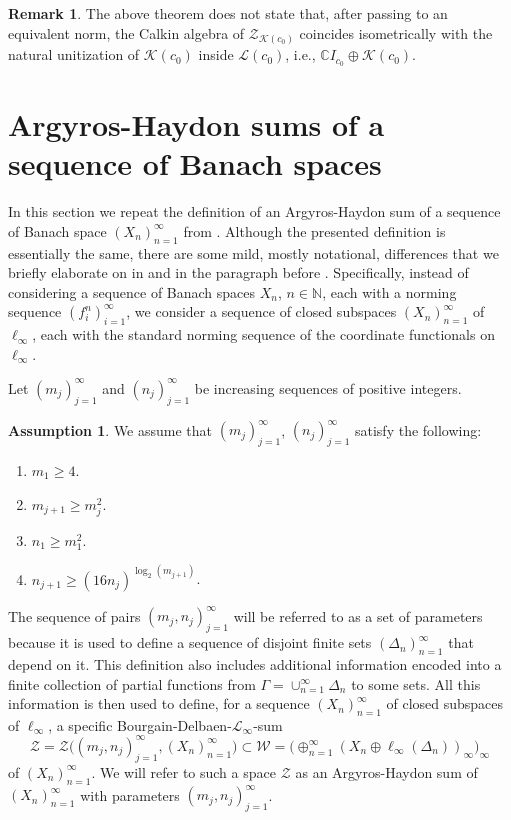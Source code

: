 \documentclass[11pt]{amsart}
\theoremstyle{definition}
\newtheorem{remark}[theorem]{Remark}
\newtheorem{assumption}[theorem]{Assumption}
\newcommand{\N}{\mathbb{N}}
\newcommand{\C}{\mathbb{C}}
\numberwithin{equation}{section}
\begin{document}
\begin{remark}
The above theorem does not state that, after passing to an equivalent norm, the Calkin algebra of $\mathcal{Z}_{\mathcal{K}(c_0)}$ coincides isometrically with the natural unitization of $\mathcal{K}(c_0)$ inside $\mathcal{L}(c_0)$, i.e.,  $\C I_{c_0}\oplus\mathcal{K}(c_0)$.
\end{remark}






\section{Argyros-Haydon sums of a sequence of Banach spaces}
\label{AH sums section}
In this section we repeat the definition of an Argyros-Haydon sum of a sequence of Banach space $(X_n)_{n=1}^\infty$ from \cite[Sections 4 and 5]{zisimopoulou:2014}. Although the presented definition is essentially the same, there are some mild, mostly notational, differences that we briefly elaborate on in  and in the paragraph before . Specifically, instead of considering a sequence of Banach spaces $X_n$, $n\in\N$, each with a norming sequence $(f_i^n)_{i=1}^\infty$, we consider a sequence of closed subspaces $(X_n)_{n=1}^\infty$ of $\ell_\infty$, each with the standard norming sequence of the coordinate functionals on $\ell_\infty$.


Let $(m_j)_{j=1}^\infty$ and $(n_j)_{j=1}^\infty$ be increasing sequences of positive integers.
\begin{assumption}
\label{lacunary assumption}
We assume that $(m_j)_{j=1}^\infty$, $(n_j)_{j=1}^\infty$ satisfy the following:
\begin{enumerate}[label=(\greek*)]
    
    \item $m_1\geq 4$.

    \item $m_{j+1}\geq m_j^2$.

    \item $n_1\geq m_1^2$.

    \item $n_{j+1}\geq (16n_j)^{\log_2(m_{j+1})}$.

\end{enumerate}
\end{assumption}
The sequence of pairs $(m_j,n_j)_{j=1}^\infty$ will be referred to as a set of parameters because it is used to define a sequence of disjoint finite sets $(\Delta_n)_{n=1}^\infty$ that depend on it. This definition also includes additional information encoded into a finite collection of partial functions from $\Gamma = \cup_{n=1}^\infty\Delta_n$ to some sets. All this information is then used to define, for a sequence $(X_n)_{n=1}^\infty$ of closed subspaces of $\ell_\infty$, a specific Bourgain-Delbaen-$\mathscr{L}_\infty$-sum
\[\mathcal{Z} = \mathcal{Z}\big((m_j,n_j)_{j=1}^\infty,(X_n)_{n=1}^\infty\big)\subset \mathcal{W} = \big(\oplus_{n=1}^\infty(X_n\oplus\ell_\infty(\Delta_n))_\infty\big)_\infty\]
of $(X_n)_{n=1}^\infty$. We will refer to such a space $\mathcal{Z}$ as an Argyros-Haydon sum of $(X_n)_{n=1}^\infty$ with parameters $(m_j,n_j)_{j=1}^\infty$.
\end{document}
